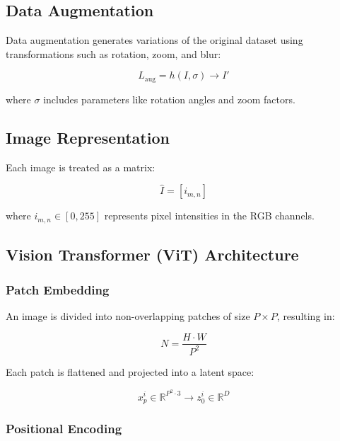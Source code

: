 \documentclass[preprint,12pt]{elsarticle}
\begin{document}
\subsection{Data Augmentation}

Data augmentation generates variations of the original dataset using transformations such as rotation, zoom, and blur:

\begin{equation}
L_{\text{aug}} = h(I, \sigma) \rightarrow I'
\label{eq:data-augmentation}
\end{equation}

where \( \sigma \) includes parameters like rotation angles and zoom factors.

\subsection{Image Representation}

Each image is treated as a matrix:

\begin{equation}
\hat{I} = [i_{m,n}]
\label{eq:image-matrix}
\end{equation}

where \( i_{m,n} \in [0,255] \) represents pixel intensities in the RGB channels.

\subsection{Vision Transformer (ViT) Architecture}

\subsubsection{Patch Embedding}

An image is divided into non-overlapping patches of size \( P \times P \), resulting in:

\begin{equation}
N = \frac{H \cdot W}{P^2}
\label{eq:num-patches}
\end{equation}

Each patch is flattened and projected into a latent space:

\begin{equation}
x_p^i \in \mathbb{R}^{P^2 \cdot 3} \rightarrow z_0^i \in \mathbb{R}^D
\label{eq:patch-projection}
\end{equation}

\subsubsection{Positional Encoding}
\end{document}
